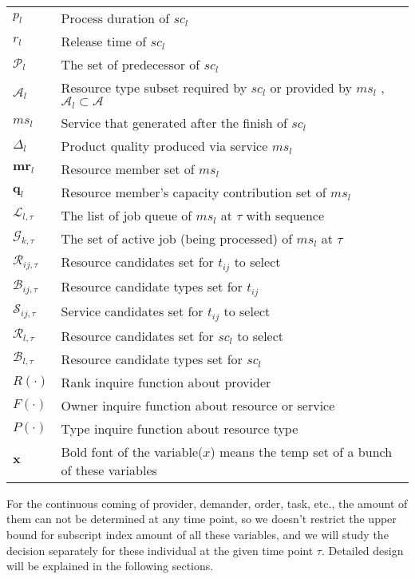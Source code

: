 \begin{table}[htbp]
\begin{tabularx}{\textwidth}{|lX|}
	$p_l$ & Process duration of $sc_l$\\
	$r_l$ & Release time of $sc_l$\\
	$\mathcal{P}_{l}$ & The set of predecessor of $sc_{l}$\\
	$\mathcal{A}_l$ & Resource type subset required by $sc_l$ or provided by $ms_l$ , $\mathcal{A}_l\subset\mathcal{A}$\\
	$ms_l$ & Service that generated after the finish of $sc_l$\\
	$\Delta_l$ & Product quality produced via service $ms_l$\\
	$\bm{mr}_l$ & Resource member set of $ms_l$\\
	$\bm{q}_l$ & Resource member's capacity contribution set of $ms_l$\\
	$\mathcal{L}_{l,\tau}$ & The list of job queue of $ms_l$ at $\tau$ with sequence\\
	$\mathcal{G}_{k,\tau}$ & The set of active job (being processed) of $ms_l$ at $\tau$ \\
	$\mathcal{R}_{ij,\tau}$ & Resource candidates set for $t_{ij}$ to select\\
	$\mathcal{B}_{ij,\tau}$ & Resource candidate types set for $t_{ij}$\\
	$\mathcal{S}_{ij,\tau}$ & Service candidates set for $t_{ij}$ to select\\
	$\mathcal{R}_{l,\tau}$ & Resource candidates set for $sc_l$ to select\\
	$\mathcal{B}_{l,\tau}$ & Resource candidate types set for $sc_l$\\
	$R(\cdot)$ & Rank inquire function about provider\\
	$F(\cdot)$ & Owner inquire function about resource or service\\
	$P(\cdot)$ & Type inquire function about resource type\\
	$\bm{x}$ & Bold font of the variable($x$) means the temp set of a bunch of these variables\\
    \hline
\end{tabularx}
\end{table}

For the continuous coming of provider, demander, order, task, etc., the amount of them can not be determined at any time point, so we doesn't restrict the upper bound for subscript index amount of all these variables, and we will study the decision separately for these individual at the given time point $\tau$. Detailed design will be explained in the following sections.

